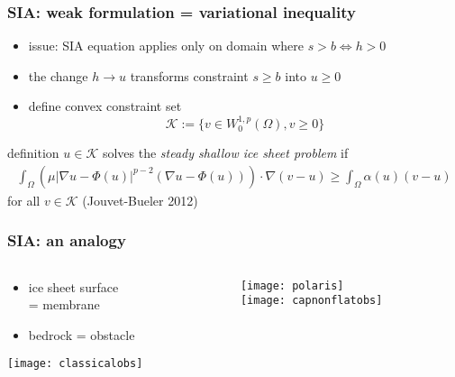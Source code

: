 \documentclass{beamer}
\newcommand{\Kcal}{\mathcal{K}}
\begin{document}
\begin{frame}
  \frametitle{SIA: weak formulation = variational inequality} 

\begin{itemize}
\item issue: SIA equation applies only on domain where $s>b \iff h > 0$
\item the change $h \to u$ transforms  constraint $s \ge b$ into $u \ge 0$
\item define convex constraint set
  $$\Kcal := \{ v \in W^{1,p}_0 (\Omega), v \ge 0 \}$$
\end{itemize}

\begin{block}{definition} 
$u \in \Kcal$ solves the \emph{steady shallow ice sheet problem} if
\begin{align*}
\int_{\Omega}    \left( \mu  | \nabla u - \Phi(u) |^{p-2} 
( \nabla u - \Phi(u) )    \right)  \cdot \nabla ( v - u )  
\ge \int_{\Omega} \alpha(u) (  v -  u ) 
\end{align*}
for all $v \in \Kcal$ \hfill \scriptsize (Jouvet-Bueler 2012)
\end{block}
\end{frame}


\begin{frame}
  \frametitle{SIA: an analogy}

\begin{columns}
\begin{column}{0.35\textwidth}
\begin{itemize}
\item ice sheet surface \\ = \alert{membrane}
\item bedrock = \alert{obstacle}
\end{itemize}
\vfill
\begin{center}
\texttt{[image: classicalobs]}
\end{center}
\end{column}
\begin{column}{0.65\textwidth}
\begin{center}
\texttt{[image: polaris]} \\
\texttt{[image: capnonflatobs]}
\end{center}
\end{column}
\end{columns}
\end{frame}
\end{document}
